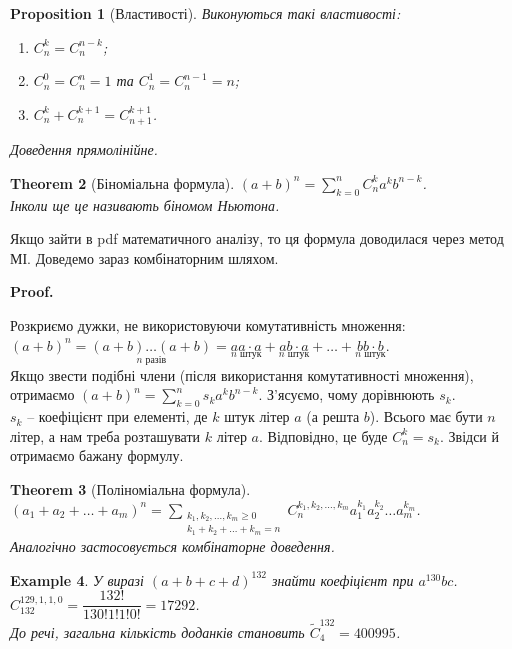 \documentclass[a4paper, 14pt]{extarticle}
\makeatletter
\theoremstyle{theoremdd}
\newtheorem{theorem}{Theorem}[subsection]
\theoremstyle{theoremdd}
\theoremstyle{theoremdd}
\theoremstyle{theoremdd}
\theoremstyle{theoremdd}
\newtheorem{example}[theorem]{Example}
\theoremstyle{theoremdd}
\theoremstyle{theoremdd}
\theoremstyle{theoremdd}
\theoremstyle{theoremdd}
\newtheorem{proposition}[theorem]{Proposition}
\theoremstyle{theoremdd}
\theoremstyle{theoremdd}
\theoremstyle{theoremdd}
\theoremstyle{theoremdd}
\theoremstyle{theoremdd}
\theoremstyle{theoremdd}
\renewenvironment{proof}[1][Proof.\\]{\par
\pushQED{\hfill \qed}%
\normalfont \topsep6\p@\@plus6\p@\relax
\trivlist
\item\relax
{\bfseries
#1\@addpunct{.}}\hspace\labelsep\ignorespaces
}{%
\popQED\endtrivlist\@endpefalse
}
\makeatother
\begin{document}
\begin{proposition}[Властивості]
Виконуються такі властивості:
\begin{enumerate}[nosep, wide=0pt, label={\arabic*)}]
\item $C_n^k = C_n^{n-k}$;
\item $C_n^0 = C_n^n = 1$ та $C_n^1 = C_n^{n-1} = n$;
\item $C_n^k + C_n^{k+1} = C_{n+1}^{k+1}$.
\end{enumerate}
\textit{Доведення прямолінійне.}
\end{proposition}

\begin{theorem}[Біноміальна формула]
$(a+b)^n = \displaystyle\sum_{k=0}^n C_n^k a^k b^{n-k}$.\\
\textit{Інколи ще це називають біномом Ньютона.}
\end{theorem}
Якщо зайти в pdf математичного аналізу, то ця формула доводилася через метод МІ. Доведемо зараз комбінаторним шляхом.

\begin{proof}
Розкриємо дужки, не використовуючи комутативність множення:\\
$(a+b)^n = \underset{n \text{ разів}}{(a+b) \dots (a+b)} = \underset{n \text{ штук}}{aa \cdot a} + \underset{n \text{ штук}}{ab \cdot a} + \dots + \underset{n \text{ штук}}{bb \cdot b}$.\\
Якщо звести подібні члени (після використання комутативності множення), отримаємо $(a+b)^n = \displaystyle\sum_{k=0}^n s_k a^k b^{n-k}$. З'ясуємо, чому дорівнюють $s_k$.\\
$s_k$ -- коефіцієнт при елементі, де $k$ штук літер $a$ (а решта $b$). Всього має бути $n$ літер, а нам треба розташувати $k$ літер $a$. Відповідно, це буде $C_n^k = s_k$. Звідси й отримаємо бажану формулу.
\end{proof}

\begin{theorem}[Поліноміальна формула]
$(a_1+a_2+\dots+a_m)^n = \displaystyle\sum_{\substack{k_1,k_2,\dots,k_m \geq 0 \\ k_1+k_2+\dots+k_m=n}} C_n^{k_1,k_2,\dots,k_m} a_1^{k_1} a_2^{k_2} \dots a_m^{k_m}$.\\
\textit{Аналогічно застосовується комбінаторне доведення.}
\end{theorem}

\begin{example}
У виразі $(a+b+c+d)^{132}$ знайти коефіцієнт при $a^{130}bc$.\\
$C_{132}^{129,1,1,0} = \dfrac{132!}{130!1!1!0!} = 17292$.\\
До речі, загальна кількість доданків становить $\tilde{C}_4^{132} = 400995$.
\end{example}
\end{document}

